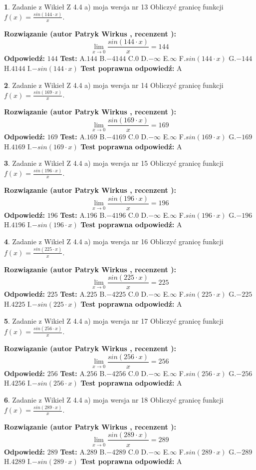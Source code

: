 \documentclass[12pt, a4paper]{article}
\theoremstyle{definition} %
\newtheorem{zad}{}
\newcommand{\zadStart}[1]{\begin{zad}#1\newline}
\newcommand{\zadStop}{\end{zad}}
\newcommand{\rozwStart}[2]{\noindent \textbf{Rozwiązanie (autor #1 , recenzent #2): }\newline}
\newcommand{\rozwStop}{\newline}
\newcommand{\odpStart}{\noindent \textbf{Odpowiedź:}\newline}
\newcommand{\odpStop}{\newline}
\newcommand{\testStart}{\noindent \textbf{Test:}\newline}
\newcommand{\testStop}{\newline}
\newcommand{\kluczStart}{\noindent \textbf{Test poprawna odpowiedź:}\newline}
\newcommand{\kluczStop}{\newline}
\begin{document}
\zadStart{Zadanie z Wikieł Z 4.4 a) moja wersja nr 13}
Obliczyć granicę funkcji $f(x)=\frac{sin(144\cdot x)}{x}$.
\zadStop
\rozwStart{Patryk Wirkus}{}
$$\lim\limits_{x\to 0}\frac{sin(144\cdot x)}{x}=
144$$
\rozwStop
\odpStart
$144$
\odpStop
\testStart
A.$144$
B.$-4144$
C.$0$
D.$-\infty$
E.$\infty$
F.$sin(144\cdot x)$
G.$-144$
H.$4144$
I.$-sin(144\cdot x)$
\testStop
\kluczStart
A
\kluczStop



\zadStart{Zadanie z Wikieł Z 4.4 a) moja wersja nr 14}
Obliczyć granicę funkcji $f(x)=\frac{sin(169\cdot x)}{x}$.
\zadStop
\rozwStart{Patryk Wirkus}{}
$$\lim\limits_{x\to 0}\frac{sin(169\cdot x)}{x}=
169$$
\rozwStop
\odpStart
$169$
\odpStop
\testStart
A.$169$
B.$-4169$
C.$0$
D.$-\infty$
E.$\infty$
F.$sin(169\cdot x)$
G.$-169$
H.$4169$
I.$-sin(169\cdot x)$
\testStop
\kluczStart
A
\kluczStop



\zadStart{Zadanie z Wikieł Z 4.4 a) moja wersja nr 15}
Obliczyć granicę funkcji $f(x)=\frac{sin(196\cdot x)}{x}$.
\zadStop
\rozwStart{Patryk Wirkus}{}
$$\lim\limits_{x\to 0}\frac{sin(196\cdot x)}{x}=
196$$
\rozwStop
\odpStart
$196$
\odpStop
\testStart
A.$196$
B.$-4196$
C.$0$
D.$-\infty$
E.$\infty$
F.$sin(196\cdot x)$
G.$-196$
H.$4196$
I.$-sin(196\cdot x)$
\testStop
\kluczStart
A
\kluczStop



\zadStart{Zadanie z Wikieł Z 4.4 a) moja wersja nr 16}
Obliczyć granicę funkcji $f(x)=\frac{sin(225\cdot x)}{x}$.
\zadStop
\rozwStart{Patryk Wirkus}{}
$$\lim\limits_{x\to 0}\frac{sin(225\cdot x)}{x}=
225$$
\rozwStop
\odpStart
$225$
\odpStop
\testStart
A.$225$
B.$-4225$
C.$0$
D.$-\infty$
E.$\infty$
F.$sin(225\cdot x)$
G.$-225$
H.$4225$
I.$-sin(225\cdot x)$
\testStop
\kluczStart
A
\kluczStop



\zadStart{Zadanie z Wikieł Z 4.4 a) moja wersja nr 17}
Obliczyć granicę funkcji $f(x)=\frac{sin(256\cdot x)}{x}$.
\zadStop
\rozwStart{Patryk Wirkus}{}
$$\lim\limits_{x\to 0}\frac{sin(256\cdot x)}{x}=
256$$
\rozwStop
\odpStart
$256$
\odpStop
\testStart
A.$256$
B.$-4256$
C.$0$
D.$-\infty$
E.$\infty$
F.$sin(256\cdot x)$
G.$-256$
H.$4256$
I.$-sin(256\cdot x)$
\testStop
\kluczStart
A
\kluczStop



\zadStart{Zadanie z Wikieł Z 4.4 a) moja wersja nr 18}
Obliczyć granicę funkcji $f(x)=\frac{sin(289\cdot x)}{x}$.
\zadStop
\rozwStart{Patryk Wirkus}{}
$$\lim\limits_{x\to 0}\frac{sin(289\cdot x)}{x}=
289$$
\rozwStop
\odpStart
$289$
\odpStop
\testStart
A.$289$
B.$-4289$
C.$0$
D.$-\infty$
E.$\infty$
F.$sin(289\cdot x)$
G.$-289$
H.$4289$
I.$-sin(289\cdot x)$
\testStop
\kluczStart
A
\kluczStop
\end{document}
